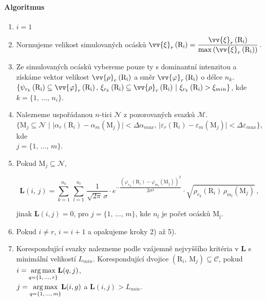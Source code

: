 \paragraph{Algoritmus}

\begin{enumerate}
\item $i = 1$

\item Normujeme velikost simulovaných ocásků $\vv{\xi}_r\left( \mathrm{R_i} \right) = \dfrac{\vv{\xi}_r\left( \mathrm{R_i} \right)}{\max \left( \vv{\xi}_r\left( \mathrm{R_i} \right) \right)}\,.$

\item Ze simulovaných ocásků vybereme pouze ty s dominantní intenzitou a získáme vektor velikost $\vv{\rho}_{r}\left(\mathrm{R_i}\right)$ a směr $\vv{\varphi}_{r}\left(\mathrm{R_i}\right)$ o délce $n_k$.\\ $\lbrace \psi_{r_k}\left(\mathrm{R_i}\right) \subseteq \vv{\varphi}_{r}\left(\mathrm{R_i}\right),\, \xi_{r_k}\left(\mathrm{R_i}\right) \subseteq \vv{\rho}_{r}\left(\mathrm{R_i}\right)\,|\,\, \xi_{r_k}\left(\mathrm{R_i}\right) > \xi_{min} \rbrace$, kde $k =\lbrace 1,\,\dots,\,n_i\rbrace $.

\item Nalezneme uspořádanou $n$-tici $\mathcal{N}$ z pozorovaných svazků $\mathcal{M}$. \\$\lbrace \mathrm{M}_j \subseteq \mathcal{N} \,\,|\,\,|\alpha_r(\mathrm{R}_i) - \alpha_m(\mathrm{M}_j) | < \Delta\alpha_{max},\, |\varepsilon_r(\mathrm{R}_i) - \varepsilon_m(\mathrm{M}_j) | < \Delta\varepsilon_{max} \rbrace$, kde \\$j=\lbrace 1,\,\dots,\,m \rbrace $.


\item Pokud $ \mathrm{M}_j \subseteq \mathcal{N}$, 

\begin{equation}
\mathbf{L}(i,\,j) = \overset{n_k}{\underset{{k = 1}}{\sum}}\, \overset{n_l}{\underset{{l = 1}}{\sum}}\,\dfrac{1}{\sqrt{2\pi}\, \sigma}\cdot e^{-\dfrac{\left(\varphi_{r_k}(\mathrm{R}_i)- \varphi_{m_l}(\mathrm{M}_j) \right)^2}{2\sigma^2}} \cdot \sqrt{\rho_{r_k}(\mathrm{R}_i)\, \rho_{m_l}(\mathrm{M}_j)}\,,
\label{eq:L_tails}
\end{equation}

  
jinak $\mathbf{L}(i,j) = 0$, pro $j =\lbrace 1,\,\dots,\,m \rbrace $, kde $n_l$ je počet ocásků $\mathrm{M_j}$.
  

\item Pokud $i \neq r$, $i = i+1$ a opakujeme kroky 2) až 5).

\item Korespondující svazky nalezneme podle vzájemně nejvyššího kritéria v $\mathbf{L}$ s minimální velikostí $L_{min}$. Korespondující dvojice $\left(\mathrm{R}_i,\,\mathrm{M}_j \right) \subseteq \mathcal{C}$, pokud  $i = \underset{{q = \lbrace1,\,\dots,\,r\rbrace}}{\operatorname*{arg\,max}}\mathbf{L}(q,j)$,\\ $j = \underset{{q = \lbrace1,\,\dots,\,m\rbrace}}{\operatorname*{arg\,max}}\mathbf{L}(i,g)$ a  $\mathbf{L}(i,j) > L_{min}$. 

\end{enumerate}

